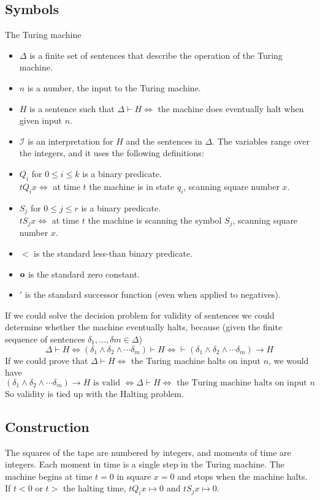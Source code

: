 \subsection{Symbols}
The Turing machine 

\begin{itemize}
\item $\Delta$ is a finite set of sentences that describe the operation of the Turing machine.
\item $n$ is a number, the input to the Turing machine.
\item $H$ is a sentence such that $\Delta\vdash H\iff$ the machine does eventually halt when given input $n$.
\item $\mathscr{I}$ is an interpretation for $H$ and the sentences in $\Delta$. The variables range over the integers, and it uses the following definitions:
\item $Q_i$ for $0 \le i \le k$ is a binary predicate.\\
$t Q_i x \iff $ at time $t$ the machine is in state $q_i$, scanning square number $x$.
\item $S_j$ for $0\le j\le r$ is a binary predicate.\\
$t S_j x \iff $ at time $t$ the machine is scanning the symbol $S_j$, scanning square number $x$.
\item $<$ is the standard less-than binary predicate.
\item $\mathbf{o}$ is the standard zero constant.
\item $'$ is the standard successor function (even when applied to negatives).
\end{itemize}

If we could solve the decision problem for validity of sentences we could determine whether the machine eventually halts, because (given the finite sequence of sentences $\delta_1,\dots,\delta m\in \Delta$)
\[\Delta\vdash H\iff (\delta_1\land \delta_2\land \cdots \delta_m)\vdash H \iff \vdash (\delta_1 \land  \delta_2 \land  \cdots\delta_m) \rightarrow H\]
If we could prove that $\Delta\vdash H \iff $ the Turing machine halts on input $n$, we would have
\[(\delta_1 \land  \delta_2 \land  \cdots\delta_m) \rightarrow H\text{ is valid }\iff \Delta\vdash H \iff \text{ the Turing machine halts on input }n\]
So validity is tied up with the Halting problem.

\subsection{Construction}
The squares of the tape are numbered by integers, and moments of time are integers. Each moment in time is a single step in the Turing machine. The machine begins at time $t=0$ in square $x=0$ and stops when the machine halts. If $t<0$ or $t>$ the halting time, $tQ_ix \mapsto 0$ and $tS_jx\mapsto 0$.

